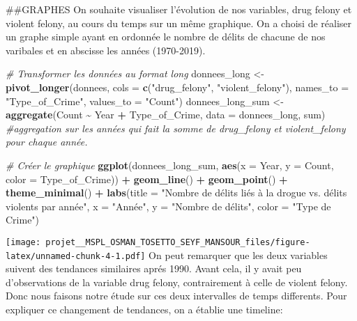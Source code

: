 \documentclass[
]{article}
\newenvironment{Shaded}{\begin{snugshade}}{\end{snugshade}}
\newcommand{\AttributeTok}[1]{\textcolor[rgb]{0.13,0.29,0.53}{#1}}
\newcommand{\CommentTok}[1]{\textcolor[rgb]{0.56,0.35,0.01}{\textit{#1}}}
\newcommand{\FunctionTok}[1]{\textcolor[rgb]{0.13,0.29,0.53}{\textbf{#1}}}
\newcommand{\NormalTok}[1]{#1}
\newcommand{\OtherTok}[1]{\textcolor[rgb]{0.56,0.35,0.01}{#1}}
\newcommand{\SpecialCharTok}[1]{\textcolor[rgb]{0.81,0.36,0.00}{\textbf{#1}}}
\newcommand{\StringTok}[1]{\textcolor[rgb]{0.31,0.60,0.02}{#1}}
\begin{document}
\#\#GRAPHES On souhaite visualiser l'évolution de nos variables, drug
felony et violent felony, au cours du temps sur un même graphique. On a
choisi de réaliser un graphe simple ayant en ordonnée le nombre de
délits de chacune de nos varibales et en abscisse les années
(1970-2019).

\begin{Shaded}
\begin{Highlighting}[]
\CommentTok{\# Transformer les données au format long}
\NormalTok{donnees\_long }\OtherTok{\textless{}{-}} \FunctionTok{pivot\_longer}\NormalTok{(donnees,}
                             \AttributeTok{cols =} \FunctionTok{c}\NormalTok{(}\StringTok{"drug\_felony"}\NormalTok{, }\StringTok{"violent\_felony"}\NormalTok{),}
                             \AttributeTok{names\_to =} \StringTok{"Type\_of\_Crime"}\NormalTok{,}
                             \AttributeTok{values\_to =} \StringTok{"Count"}\NormalTok{)}
\NormalTok{donnees\_long\_sum }\OtherTok{\textless{}{-}} \FunctionTok{aggregate}\NormalTok{(Count }\SpecialCharTok{\textasciitilde{}}\NormalTok{ Year }\SpecialCharTok{+}\NormalTok{ Type\_of\_Crime, }\AttributeTok{data =}\NormalTok{ donnees\_long, sum) }\CommentTok{\#aggregation sur les années qui fait la somme de drug\_felony et violent\_felony pour chaque année.}

\CommentTok{\# Créer le graphique}
\FunctionTok{ggplot}\NormalTok{(donnees\_long\_sum, }\FunctionTok{aes}\NormalTok{(}\AttributeTok{x =}\NormalTok{ Year, }\AttributeTok{y =}\NormalTok{ Count, }\AttributeTok{color =}\NormalTok{ Type\_of\_Crime)) }\SpecialCharTok{+}
  \FunctionTok{geom\_line}\NormalTok{() }\SpecialCharTok{+}
  \FunctionTok{geom\_point}\NormalTok{() }\SpecialCharTok{+}
  \FunctionTok{theme\_minimal}\NormalTok{() }\SpecialCharTok{+}
  \FunctionTok{labs}\NormalTok{(}\AttributeTok{title =} \StringTok{"Nombre de délits liés à la drogue vs. délits violents par année"}\NormalTok{,}
       \AttributeTok{x =} \StringTok{"Année"}\NormalTok{,}
       \AttributeTok{y =} \StringTok{"Nombre de délits"}\NormalTok{,}
       \AttributeTok{color =} \StringTok{"Type de Crime"}\NormalTok{)}
\end{Highlighting}
\end{Shaded}

\texttt{[image: projet\_\_MSPL\_OSMAN\_TOSETTO\_SEYF\_MANSOUR\_files/figure-latex/unnamed-chunk-4-1.pdf]}
On peut remarquer que les deux variables suivent des tendances
similaires aprés 1990. Avant cela, il y avait peu d'observations de la
variable drug felony, contrairement à celle de violent felony. Donc nous
faisons notre étude sur ces deux intervalles de temps differents. Pour
expliquer ce changement de tendances, on a établie une timeline:
\end{document}
